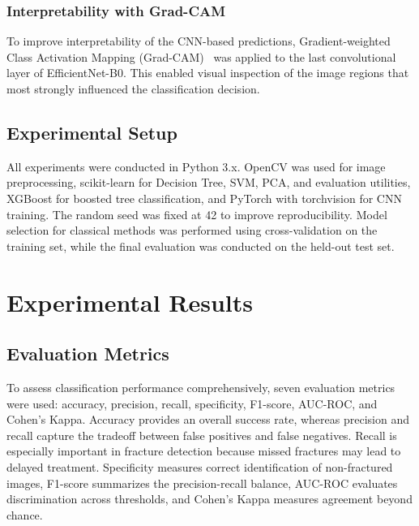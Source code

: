 \documentclass[conference]{IEEEtran}
\begin{document}
\subsubsection{Interpretability with Grad-CAM}

To improve interpretability of the CNN-based predictions, Gradient-weighted Class Activation Mapping (Grad-CAM)~\cite{selvaraju2017} was applied to the last convolutional layer of EfficientNet-B0. This enabled visual inspection of the image regions that most strongly influenced the classification decision.

\subsection{Experimental Setup}

All experiments were conducted in Python 3.x. OpenCV was used for image preprocessing, scikit-learn for Decision Tree, SVM, PCA, and evaluation utilities, XGBoost for boosted tree classification, and PyTorch with torchvision for CNN training. The random seed was fixed at 42 to improve reproducibility. Model selection for classical methods was performed using cross-validation on the training set, while the final evaluation was conducted on the held-out test set.

\section{Experimental Results}

\subsection{Evaluation Metrics}

To assess classification performance comprehensively, seven evaluation metrics were used: accuracy, precision, recall, specificity, F1-score, AUC-ROC, and Cohen's Kappa. Accuracy provides an overall success rate, whereas precision and recall capture the tradeoff between false positives and false negatives. Recall is especially important in fracture detection because missed fractures may lead to delayed treatment. Specificity measures correct identification of non-fractured images, F1-score summarizes the precision-recall balance, AUC-ROC evaluates discrimination across thresholds, and Cohen's Kappa measures agreement beyond chance.
\end{document}
